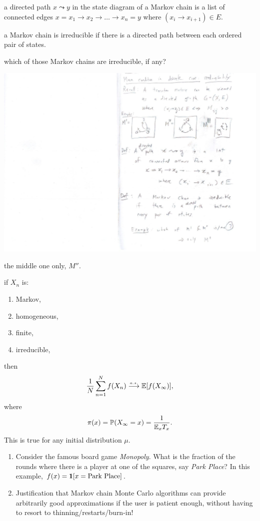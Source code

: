 \documentclass{article}
\begin{document}
 a directed path $x \leadsto y$ in the state diagram of a Markov chain is a list of connected edges $x = x_1 \to x_2 \to \dots \to x_n = y$ where $(x_i \to x_{i+1}) \in E$.

 a Markov chain is irreducible if there is a directed path between each ordered pair of states.

 which of those Markov chains are irreducible, if any?
\begin{center}
	\includegraphics[width=0.6\linewidth]{figures/irred-example} 
\end{center}
 the middle one only, $M''$.

 if $X_n$ is:
\begin{enumerate}
  \item Markov,
  \item homogeneous,
  \item finite, 
  \item irreducible,
\end{enumerate}
then \[ \frac{1}{N} \sum_{n=1}^N f(X_n) \stackrel{\scriptscriptstyle a.s.}{\longrightarrow} {\mathbb E}[f(X_\infty)],\]
where \[\pi(x) = {\mathbb P}(X_\infty = x) = \frac{1}{{\mathbb E}_x T_x}. \] This is true for any initial distribution $\mu$.

\begin{enumerate}
	\item Consider the famous board game \emph{Monopoly}. What is the fraction of the rounds where there is a player at one of the squares, say \emph{Park Place}? In this example, $f(x) = {\mathbf 1}[x = \text{Park Place}]$.
	\item Justification that Markov chain Monte Carlo algorithms can provide arbitrarily good approximations if the user is patient enough, without having to resort to thinning/restarts/burn-in!
\end{enumerate}
\end{document}
